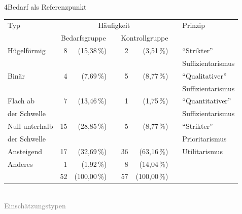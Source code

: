 \documentclass[xcolor=table,9pt,aspectratio=169]{beamer}
\begin{document}
\begin{frame}{\vspace*{10mm}4\hspace*{1em}Bedarf als Referenzpunkt}
\begin{center}
   \begin{tabular}[h]{lrrrrrrl}
      \arrayrulecolor{blue2}
      \hline
      Typ              & \multicolumn{5}{c}{Häufigkeit}      &   & Prinzip                                                              \\
      \cline{2-6}
                       & \multicolumn{2}{c}{Bedarfsgruppe}   &   & \multicolumn{2}{c}{Kontrollgruppe}   &   &                           \\
      \hline
      Hügelförmig      &  8   &  (15,38\,\%)                 &   &  2   &   (3,51\,\%)                  &   & \enquote{Strikter}        \\
                       &      &                              &   &      &                               &   & Suffizientarismus         \\[1ex]
      Binär            &  4   &   (7,69\,\%)                 &   &  5   &   (8,77\,\%)                  &   & \enquote{Qualitativer}    \\
                       &      &                              &   &      &                               &   & Suffizientarismus         \\[1ex]
      Flach ab         &  7   &  (13,46\,\%)                 &   &  1   &   (1,75\,\%)                  &   & \enquote{Quantitativer}   \\
      der Schwelle     &      &                              &   &      &                               &   & Suffizientarismus         \\[1ex]
      Null unterhalb   & 15   &  (28,85\,\%)                 &   &  5   &   (8,77\,\%)                  &   & \enquote{Strikter}        \\
      der Schwelle     &      &                              &   &      &                               &   & Prioritarismus            \\[1ex]
      Ansteigend       & 17   &  (32,69\,\%)                 &   & 36   &  (63,16\,\%)                  &   & Utilitarismus             \\[1ex]
      Anderes          &  1   &   (1,92\,\%)                 &   &  8   &  (14,04\,\%)                  &   &                           \\
      \hline
                       & 52   & (100,00\,\%)                 &   & 57   & (100,00\,\%)                  &   &                           \\
      \hline
   \end{tabular}\\
   \smallskip
   \footnotesize{\textcolor{gray}{Einschätzungstypen}}
\end{center}
\end{frame}
\end{document}
